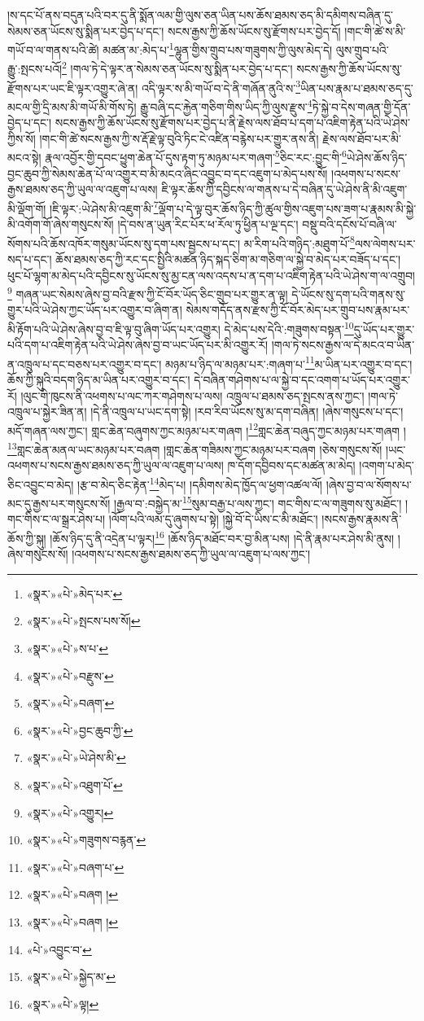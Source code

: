 །ས་དང་པོ་ནས་བདུན་པའི་བར་དུ་ནི་སྨོན་ལམ་གྱི་ལུས་ཅན་ཡིན་པས་ཆོས་ཐམས་ཅད་མི་དམིགས་བཞིན་དུ་སེམས་ཅན་ཡོངས་སུ་སྨིན་པར་བྱེད་པ་དང་། སངས་རྒྱས་ཀྱི་ཆོས་ཡོངས་སུ་རྫོགས་པར་བྱེད་དོ། །གང་གི་ཚེ་ས་མི་གཡོ་བ་ལ་གནས་པའི་ཚེ། མཚན་མ་:མེད་པ་\footnote{«སྣར་»«པེ་»མེད་པར་}ལྷུན་གྱིས་གྲུབ་པས་གཟུགས་ཀྱི་ལུས་མེད་དེ། ལུས་གྲུབ་པའི་རྒྱུ་:སྤངས་པའོ།\footnote{«སྣར་»«པེ་»སྤངས་པས་སོ།} །གལ་ཏེ་དེ་ལྟར་ན་སེམས་ཅན་ཡོངས་སུ་སྨིན་པར་བྱེད་པ་དང་། སངས་རྒྱས་ཀྱི་ཆོས་ཡོངས་སུ་རྫོགས་པར་ཡང་ཇི་ལྟར་འགྱུར་ཞེ་ན། འདི་ལྟར་ས་མི་གཡོ་བ་དེ་ནི་གཞོན་ནུའི་ས་\footnote{«སྣར་»«པེ་»ས་པ་}ཡིན་པས་རྣམ་པ་ཐམས་ཅད་དུ་མངལ་གྱི་དྲི་མས་མི་གཡོ་མི་གོས་ཏེ། རྒྱུ་བཞི་དང་རྐྱེན་གཅིག་གིས་ཡིད་ཀྱི་ལུས་རྫུས་\footnote{«སྣར་»«པེ་»བརྫུས་}ཏེ་སྐྱེ་བ་དེས་གཞན་གྱི་དོན་བྱེད་པ་དང་། སངས་རྒྱས་ཀྱི་ཆོས་ཡོངས་སུ་རྫོགས་པར་བྱེད་པ་ནི་རྗེས་ལས་ཐོབ་པ་དག་པ་འཇིག་རྟེན་པའི་ཡེ་ཤེས་ཀྱིས་སོ། །གང་གི་ཚེ་སངས་རྒྱས་ཀྱི་ས་རྡོ་རྗེ་ལྟ་བུའི་ཏིང་ངེ་འཛིན་བརྙེས་པར་གྱུར་ནས་ནི། རྗེས་ལས་ཐོབ་པར་མི་མངའ་སྟེ། རྣལ་འབྱོར་གྱི་དབང་ཕྱུག་ཆེན་པོ་དུས་རྟག་ཏུ་མཉམ་པར་གཞག་\footnote{«སྣར་»«པེ་»བཞག་}ཅིང་རང་:བྱུང་གི་\footnote{«སྣར་»«པེ་»བྱང་ཆུབ་ཀྱི་}ཡེ་ཤེས་ཆོས་ཉིད་བྱང་ཆུབ་ཀྱི་སེམས་ཆེན་པོ་ལ་འགྱུར་བ་མི་མངའ་ཞིང་འབྱུང་བ་དང་འཇུག་པ་མེད་པས་སོ། །འཕགས་པ་སངས་རྒྱས་ཐམས་ཅད་ཀྱི་ཡུལ་ལ་འཇུག་པ་ལས། ཇི་ལྟར་ཆོས་ཀྱི་དབྱིངས་ལ་གནས་པ་དེ་བཞིན་དུ་ཡེ་ཤེས་ནི་མི་འཇུག་མི་ལྡོག་གོ། །ཇི་ལྟར་:ཡེ་ཤེས་མི་འཇུག་མི་\footnote{«སྣར་»«པེ་»ཡེ་ཤེས་མི་}ལྡོག་པ་དེ་ལྟ་བུར་ཆོས་ཉིད་ཀྱི་ཚུལ་གྱིས་འཇུག་པས་ཟག་པ་རྣམས་མི་སྐྱེ་མི་འགོག་གོ་ཞེས་གསུངས་སོ། །དེ་བས་ན་ཡུན་རིང་པོར་ཕ་རོལ་ཏུ་ཕྱིན་པ་ལྔ་དང་། བསྡུ་བའི་དངོས་པོ་བཞི་ལ་སོགས་པའི་ཆོས་འཁོར་གསུམ་ཡོངས་སུ་དག་པས་སྦྱངས་པ་དང་། མ་རིག་པའི་གཉིད་:མཐུག་པོ་\footnote{«སྣར་»«པེ་»འཐུག་པོ་}ལས་ལེགས་པར་སད་པ་དང་། ཆོས་ཐམས་ཅད་ཀྱི་རང་དང་སྤྱིའི་མཚན་ཉིད་སྐད་ཅིག་མ་གཅིག་ལ་སྐྱེ་བ་མེད་པར་བཟོད་པ་དང་། ཕུང་པོ་ལྷག་མ་མེད་པའི་དབྱིངས་སུ་ཡོངས་སུ་མྱ་ངན་ལས་འདས་པ་ན་དག་པ་འཇིག་རྟེན་པའི་ཡེ་ཤེས་ག་ལ་འགྲུབ།\footnote{«སྣར་»«པེ་»འགྱུར།} གཞན་ཡང་སེམས་ཞེས་བྱ་བའི་རྫས་ཀྱི་ངོ་བོར་ཡོད་ཅིང་གྲུབ་པར་གྱུར་ན་ལྟ། དེ་ཡོངས་སུ་དག་པའི་གནས་སུ་གྱུར་པའི་ཡེ་ཤེས་ཀྱང་ཡོད་པར་འགྱུར་བ་ཞིག་ན། སེམས་གདོད་ནས་རྫས་ཀྱི་ངོ་བོར་མེད་པར་གྲུབ་པས་རྣམ་པར་མི་རྟོག་པའི་ཡེ་ཤེས་ཞེས་བྱ་བ་ཇི་ལྟ་བུ་ཞིག་ཡོད་པར་འགྱུར། དེ་མེད་པས་དེའི་:གཟུགས་བསྟན་\footnote{«སྣར་»«པེ་»གཟུགས་བརྙན་}དུ་ཡོད་པར་གྱུར་པའི་དག་པ་འཇིག་རྟེན་པའི་ཡེ་ཤེས་ཞེས་བྱ་བ་ཡང་ཡོད་པར་མི་འགྱུར་རོ། །གལ་ཏེ་སངས་རྒྱས་ལ་དེ་མངའ་བ་ཡིན་ན་འཁྲུལ་པ་དང་བཅས་པར་འགྱུར་བ་དང་། མཉམ་པ་ཉིད་ལ་མཉམ་པར་:གཞག་པ་\footnote{«སྣར་»«པེ་»བཞག་པ་}མ་ཡིན་པར་འགྱུར་བ་དང་། ཆོས་ཀྱི་སྐུའི་བདག་ཉིད་མ་ཡིན་པར་འགྱུར་བ་དང་། དེ་བཞིན་གཤེགས་པ་ལ་སྐྱེ་བ་དང་འགག་པ་ཡོད་པར་འགྱུར་རོ། །ལུང་གི་ཁུངས་ནི་འཕགས་པ་ལང་ཀར་གཤེགས་པ་ལས། འཁྲུལ་པ་ཐམས་ཅད་སྤངས་ནས་ཀྱང་། །གལ་ཏེ་འཁྲུལ་པ་སྐྱེར་ཟིན་ན། །དེ་ནི་འཁྲུལ་པ་ཡང་དག་སྟེ། །རབ་རིབ་ཡོངས་སུ་མ་དག་བཞིན། །ཞེས་གསུངས་པ་དང་། མདོ་གཞན་ལས་ཀྱང་། གླང་ཆེན་བཞུགས་ཀྱང་མཉམ་པར་གཞག །\footnote{«སྣར་»«པེ་»བཞག །}གླང་ཆེན་བཞུད་ཀྱང་མཉམ་པར་གཞག །\footnote{«སྣར་»«པེ་»བཞག །}གླང་ཆེན་མནལ་ཡང་མཉམ་པར་བཞག །གླང་ཆེན་གཟིམས་ཀྱང་མཉམ་པར་བཞག །ཅེས་གསུངས་སོ། །ཡང་འཕགས་པ་སངས་རྒྱས་ཐམས་ཅད་ཀྱི་ཡུལ་ལ་འཇུག་པ་ལས། ཁ་དོག་དབྱིབས་དང་མཚན་མ་མེད། །འགག་པ་མེད་ཅིང་འབྱུང་བ་མེད། །རྩ་བ་མེད་ཅིང་རྟེན་\footnote{«པེ་»འབྱུང་བ་}མེད་པ། །དམིགས་མེད་ཁྱོད་ལ་ཕྱག་འཚལ་ལོ། །ཞེས་བྱ་བ་ལ་སོགས་པ་མང་དུ་རྒྱས་པར་གསུངས་སོ། །རྒྱལ་བ་:བསྐྱེད་མ་\footnote{«སྣར་»«པེ་»སྐྱེད་མ་}སུམ་བརྒྱ་པ་ལས་ཀྱང་། གང་གིས་ང་ལ་གཟུགས་སུ་མཐོང་། །གང་གིས་ང་ལ་སྒྲར་ཤེས་པ། །ལོག་པའི་ལམ་དུ་ཞུགས་པ་སྟེ། །སྐྱེ་བོ་དེ་ཡིས་ང་མི་མཐོང་། །སངས་རྒྱས་རྣམས་ནི་ཆོས་ཀྱི་སྐུ། །ཆོས་ཉིད་དུ་ནི་འདྲེན་པ་ལྟར།\footnote{«སྣར་»«པེ་»ལྟ།} །ཆོས་ཉིད་མཐོང་བར་བྱ་མིན་པས། །དེ་ནི་རྣམ་པར་ཤེས་མི་ནུས། །ཞེས་གསུངས་སོ། །འཕགས་པ་སངས་རྒྱས་ཐམས་ཅད་ཀྱི་ཡུལ་ལ་འཇུག་པ་ལས་ཀྱང་། 